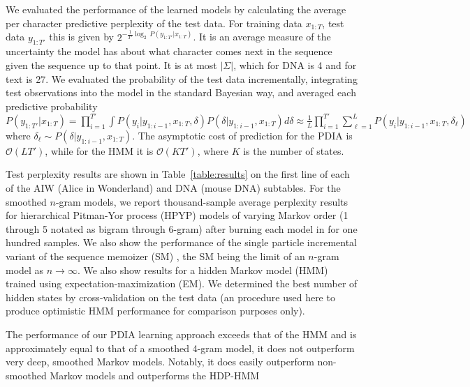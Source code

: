 We evaluated the performance of the learned models by calculating the average per character predictive perplexity of the test data.  For training data $x_{1:T}$, test data $y_{1:T'}$ this is given by $2^{-\frac{1}{T'}\log_2\, P(y_{1:T'}|x_{1:T})}$.  It is an average measure of the uncertainty the model has about what character comes next in the sequence given the sequence up to that point. It is at most $|\Sigma|$, which for DNA is 4 and for text is 27.  We evaluated the probability of the test data incrementally, integrating test observations into the model in the standard Bayesian way, and averaged each predictive probability $P(y_{1:T'}|x_{1:T}) =  \prod_{i = 1}^{T'} \int P(y_i|y_{1:i-1},x_{1:T},\delta)P(\delta|y_{1:i-1},x_{1:T})d\delta \approx \frac{1}{L}\prod_{i = 1}^{T'} \sum_{\ell = 1}^{L} P(y_i|y_{1:i-1},x_{1:T},\delta_\ell)$ where $\delta_\ell \sim P(\delta|y_{1:i-1},x_{1:T})$.  The asymptotic cost of prediction for the PDIA is $\mathcal{O}(LT')$, while for the HMM it is $\mathcal{O}(KT')$, where $K$ is the number of states.%

Test perplexity results are shown in Table~\ref{table:results} on the first line of each of the AIW (Alice in Wonderland) and DNA (mouse DNA) subtables.  
For the smoothed $n$-gram models, we report thousand-sample average perplexity results for hierarchical Pitman-Yor process (HPYP) \cite{Teh2006a} models of varying Markov order (1 through 5 notated as bigram through 6-gram) after burning each model in for one hundred samples.  We also show the performance of the single particle incremental variant of the sequence memoizer (SM) \cite{Gasthaus2010}, the SM being the limit of an $n$-gram model as $n\rightarrow\infty$.
We also show results for a hidden Markov model (HMM) \cite{Murphy2005} trained using expectation-maximization (EM).  We determined the best number of hidden states by cross-validation on the test data (an procedure used here to produce optimistic HMM performance for comparison purposes only).  


The performance of our PDIA learning approach exceeds that of the HMM and is approximately equal to that of a smoothed 4-gram model, it does not outperform very deep, smoothed Markov models.  Notably, it does easily outperform non-smoothed Markov models and outperforms the HDP-HMM 

